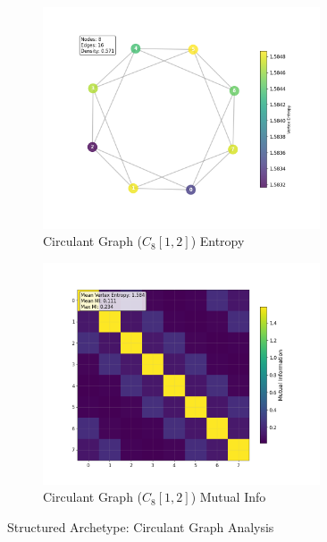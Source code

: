 \documentclass[12pt, letterpaper]{article}
\begin{document}
\begin{figure}[H]
    \centering
    \begin{subfigure}[b]{0.48\textwidth}
        \includegraphics[width=0.9\textwidth]{images/Graph Visualizations/Structured/Circulant_Vertex_Entropy.png}
        \caption{Circulant Graph ($C_8[1,2]$) Entropy}
        \label{fig:circulant_entropy}
    \end{subfigure}
    \hfill
    \begin{subfigure}[b]{0.48\textwidth}
        \includegraphics[width=0.9\textwidth]{images/Graph Visualizations/Structured/Circulant_Vertex_MI_Matrix.png}
        \caption{Circulant Graph ($C_8[1,2]$) Mutual Info}
        \label{fig:circulant_mi}
    \end{subfigure}
    \caption{Structured Archetype: Circulant Graph Analysis}
    \label{fig:circulant_analysis}
\end{figure}
\end{document}
